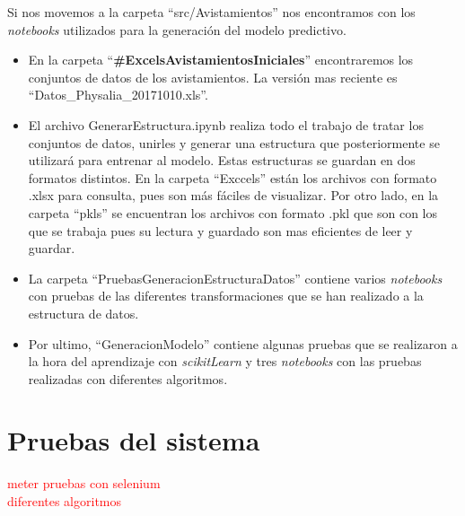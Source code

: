 Si nos movemos a la carpeta ``src/Avistamientos'' nos encontramos con los \emph{notebooks} utilizados para la generación del modelo predictivo.
\begin{itemize}
	\item En la carpeta ``\textbf{\#ExcelsAvistamientosIniciales}'' encontraremos los conjuntos de datos de los avistamientos. La versión mas reciente es ``Datos\_Physalia\_20171010.xls''.
	\item El archivo GenerarEstructura.ipynb realiza todo el trabajo de tratar los conjuntos de datos, unirles y generar una estructura que posteriormente se utilizará para entrenar al modelo. Estas estructuras se guardan en dos formatos distintos. En la carpeta ``Exccels'' están los archivos con formato .xlsx para consulta, pues son más fáciles de visualizar. Por otro lado, en la carpeta ``pkls'' se encuentran los archivos con formato .pkl que son con los que se trabaja pues su lectura y guardado son mas eficientes de leer y guardar.
	\item La carpeta ``PruebasGeneracionEstructuraDatos'' contiene varios \emph{notebooks} con pruebas de las diferentes transformaciones que se han realizado a la estructura de datos. 
	\item Por ultimo, ``GeneracionModelo'' contiene algunas pruebas que se realizaron a la hora del aprendizaje con \emph{scikitLearn} y tres \emph{notebooks} con las  pruebas realizadas con diferentes algoritmos.
\end{itemize}

\section{Pruebas del sistema}

\textcolor{red}{meter pruebas con selenium}\\
\textcolor{red}{diferentes algoritmos}


